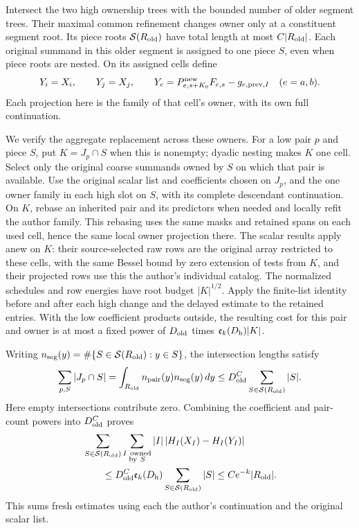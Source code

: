Intersect the two high ownership trees with the bounded number of
older segment trees.  Their maximal common refinement changes
owner only at a constituent segment root.  Its piece roots
\(\mathcal S(R_{\rm old})\) have total length at most
\(C|R_{\rm old}|\).  Each original summand in this older segment
is assigned to one piece \(S\), even when piece roots are nested.
On its assigned cells define
\begin{equation}
 Y_i=X_i,\qquad Y_j=X_j,\qquad
 Y_e=P^{\rm new}_{e,s+K_0}F_{e,s}
          -g_{e,\mathrm{prev},I}\quad(e=a,b).                  \label{eq:hbase-Y}
\end{equation}
Each projection here is the family of that cell's owner, with its
own full continuation.

We verify the aggregate replacement across these owners.  For a
low pair \(p\) and piece \(S\), put \(K=J_p\cap S\) when this is
nonempty; dyadic nesting makes \(K\) one cell.  Select only the
original coarse summands owned by \(S\) on which that pair is
available.  Use the original scalar list and coefficients chosen
on \(J_p\), and the one owner family in each high slot on \(S\),
with its complete descendant continuation.  On \(K\), rebase an
inherited pair and its predictors when needed and locally refit
the author family.  This rebasing uses the same masks and retained spans
on each used cell, hence the same local owner projection there.
The scalar results apply anew on \(K\):
their source-selected raw rows are the original array restricted
to these cells, with the same Bessel bound by zero extension of
tests from \(K\), and their projected rows use this the author's
individual catalog.  The normalized schedules and row energies
have root budget \(|K|^{1/2}\).  Apply the finite-list identity
before and after each high change and the delayed estimate to the
retained entries.  With the low coefficient products outside,
the resulting cost for this pair and owner is at most a fixed
power of \(D_{\rm old}\) times
\(\mathfrak e_k(D_{\rm h})|K|\).

Writing \(n_{\rm seg}(y)=\#\{S\in\mathcal S(R_{\rm old}):y\in S\}\),
the intersection lengths satisfy
\[
 \sum_{p,S}|J_p\cap S|
 =\int_{R_{\rm old}}n_{\rm pair}(y)n_{\rm seg}(y)\,dy
 \le D_{\rm old}^C\sum_{S\in\mathcal S(R_{\rm old})}|S|.
\]
Here empty intersections contribute zero.  Combining the coefficient
and pair-count powers into \(D_{\rm old}^C\) proves
\begin{align}
 &\sum_{S\in\mathcal S(R_{\rm old})}
     \sum_{\substack{I\ {\rm owned}\\{\rm by}\ S}}
       |I|\,|H_I(X_I)-H_I(Y_I)|
 \nonumber\\
 &\qquad\le
 D_{\rm old}^C\mathfrak e_k(D_{\rm h})
       \sum_{S\in\mathcal S(R_{\rm old})}|S|
 \le Ce^{-k}|R_{\rm old}|.                                    \label{eq:hbase-high-errors}
\end{align}
This sums fresh estimates using each the author's continuation and the
original scalar list.

